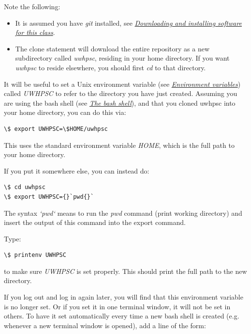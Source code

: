 \documentclass[letterpaper,10pt,english]{sphinxmanual}
\begin{document}
Note the following:
\begin{itemize}
\item {} 
It is assumed you have \emph{git} installed, see
{\hyperref[software_installation:software-installation]{\emph{Downloading and installing software for this class}}}.

\item {} 
The clone statement will download the entire repository as a new
subdirectory called \emph{uwhpsc}, residing in your home directory.  If you
want \emph{uwhpsc} to reside elsewhere, you should first \emph{cd} to that
directory.

\end{itemize}

It will be useful to set a Unix environment variable (see {\hyperref[unix:env]{\emph{Environment variables}}}) called
\emph{UWHPSC} to refer to the directory you have just created.  Assuming you are
using the bash shell (see {\hyperref[unix:bash]{\emph{The bash shell}}}), and that you cloned uwhpsc
into your home directory, you can do this via:

\begin{Verbatim}[commandchars=\\\{\}]
\$ export UWHPSC=\$HOME/uwhpsc
\end{Verbatim}

This uses the standard environment variable \emph{HOME}, which is the full path
to your home directory.

If you put it somewhere else, you can instead do:

\begin{Verbatim}[commandchars=\\\{\}]
\$ cd uwhpsc
\$ export UWHPSC={}`pwd{}`
\end{Verbatim}

The syntax
\emph{{}`pwd{}`} means to run the \emph{pwd} command (print working directory) and insert the
output of this command into the export command.

Type:

\begin{Verbatim}[commandchars=\\\{\}]
\$ printenv UWHPSC
\end{Verbatim}

to make sure \emph{UWHPSC} is set properly. This should print the full path to the
new directory.

If you log out and log in again later, you will find that this environment
variable is no longer set.  Or if you set it in one terminal window, it
will not be set in others.  To have it set automatically every time a new
bash shell is created (e.g. whenever a new terminal window is opened), add a
line of the form:
\end{document}
